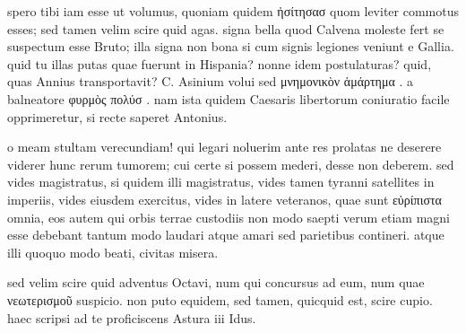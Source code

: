 


 spero tibi iam esse ut volumus, quoniam quidem ἠσίτησασ quom leviter commotus esses; sed tamen velim scire quid agas. signa bella quod Calvena moleste fert se suspectum esse Bruto; illa signa non bona si cum signis legiones veniunt e Gallia. quid tu illas putas quae fuerunt in Hispania? nonne idem postulaturas? quid, quas Annius transportavit? C. Asinium volui sed μνημονικὸν ἁμάρτημα . a balneatore φυρμὸς πολύσ . nam ista quidem Caesaris libertorum coniuratio facile opprimeretur, si recte saperet Antonius.

 o meam stultam verecundiam! qui legari noluerim ante res prolatas ne deserere viderer hunc rerum tumorem; cui certe si possem mederi, desse non deberem. sed vides magistratus, si quidem illi magistratus, vides tamen tyranni satellites in imperiis, vides eiusdem exercitus, vides in latere veteranos, quae sunt εὐρίπιστα omnia, eos autem qui orbis terrae custodiis non modo saepti verum etiam magni esse debebant tantum modo laudari atque amari sed parietibus contineri. atque illi quoquo modo beati, civitas misera.

 sed velim scire quid adventus Octavi, num qui concursus ad eum, num quae νεωτερισμοῦ suspicio. non puto equidem, sed tamen, quicquid est, scire cupio. haec scripsi ad te proficiscens Astura iii Idus.
